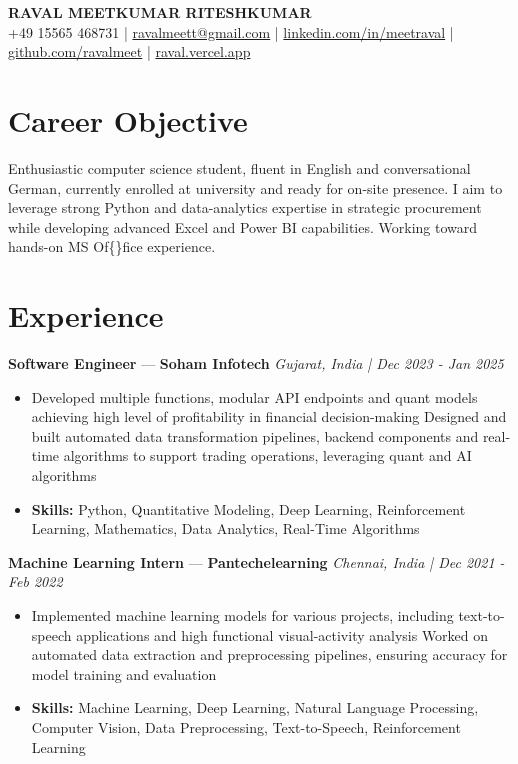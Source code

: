 \documentclass[a4paper,10pt]{article}
\begin{document}
\begin{center}
  {\Large\bfseries RAVAL MEETKUMAR RITESHKUMAR}\\[2pt]
  {\small +49 15565 468731 \;|\; \href{mailto:ravalmeett@gmail.com}{ravalmeett@gmail.com} \;|\; \href{https://www.linkedin.com/in/meetraval/}{linkedin.com/in/meetraval} \;|\; \href{https://github.com/ravalmeet}{github.com/ravalmeet} \;|\; \href{https://raval.vercel.app/}{raval.vercel.app}}
\end{center}
\vspace{-3pt}

\section*{Career Objective}
Enthusiastic computer science student, fluent in English and conversational German, currently enrolled at university and ready for on-site presence. I aim to leverage strong Python and data-analytics expertise in strategic procurement while developing advanced Excel and Power BI capabilities. Working toward hands-on MS Of\{\}fice experience.\par

\section*{Experience}
\textbf{Software Engineer} — \textbf{Soham Infotech} \hfill \textit{Gujarat, India \;|\; Dec 2023 - Jan 2025}\par
\vspace{1pt}
\begin{itemize}
  \item Developed multiple functions, modular API endpoints and quant models achieving high level of profitability in financial decision-making Designed and built automated data transformation pipelines, backend components and real-time algorithms to support trading operations, leveraging quant and AI algorithms
  \item \textbf{Skills:} Python, Quantitative Modeling, Deep Learning, Reinforcement Learning, Mathematics, Data Analytics, Real-Time Algorithms
\end{itemize}
\vspace{3pt}
\textbf{Machine Learning Intern} — \textbf{Pantechelearning} \hfill \textit{Chennai, India \;|\; Dec 2021 - Feb 2022}\par
\vspace{1pt}
\begin{itemize}
  \item Implemented machine learning models for various projects, including text-to-speech applications and high functional visual-activity analysis Worked on automated data extraction and preprocessing pipelines, ensuring accuracy for model training and evaluation
  \item \textbf{Skills:} Machine Learning, Deep Learning, Natural Language Processing, Computer Vision, Data Preprocessing, Text-to-Speech, Reinforcement Learning
\end{itemize}
\end{document}
